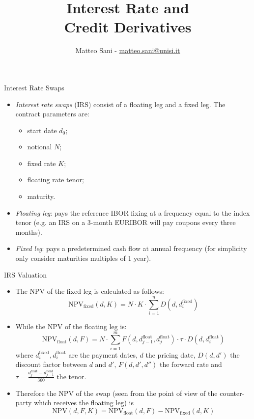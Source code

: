 \documentclass{beamer}
\title{Interest Rate and\\\vspace{0.25cm}Credit Derivatives}
\author{Matteo Sani - \href{mailto:matteo.sani@unisi.it}{matteo.sani@unisi.it}}
\begin{document}
\begin{frame}[plain]
	\maketitle
\end{frame}

\begin{frame}{Interest Rate Swaps}
	\begin{itemize}
		\item \emph{Interest rate swaps} (IRS) consist of a floating leg and a fixed leg. The contract parameters are:
		\begin{itemize}
		\item start date $d_0$;
		\item notional $N$;
		\item fixed rate $K$;
		\item floating rate tenor;
		\item maturity.
		\end{itemize}
		\item \emph{Floating leg}: pays the reference IBOR fixing at a frequency equal to the index tenor (e.g. an IRS on a 3-month EURIBOR will pay coupons every three months).
		\item \emph{Fixed leg}: pays a predetermined cash flow at annual frequency (for simplicity only consider maturities multiples of 1 year).
	\end{itemize}
\end{frame}

\begin{frame}{IRS Valuation}
	\begin{itemize}
		\item The NPV of the fixed leg is calculated as follows:
		\begin{equation*}
		\mathrm{NPV}_{\mathrm{fixed}}(d, K) = N\cdot K\cdot\sum_{i=1}^{n}D(d, d_{i}^{\mathrm{fixed}})
		\end{equation*}
		\item While the NPV of the floating leg is:
		\begin{equation*}
			\mathrm{NPV}_{\mathrm{float}}(d, F) = N\cdot\sum_{i=1}^{m}F(d, d_{j-1}^{\mathrm{float}}, d_{j}^{\mathrm{float}}) \cdot \tau
\cdot D(d, d_{i}^{\mathrm{float}})
		\end{equation*}
		where $d_i^{\mathrm{fixed}}, d_i^{\mathrm{float}}$ are the payment dates, $d$ the pricing date, $D(d, d')$ the discount factor between $d$ and $d'$, $F(d, d', d'')$ the forward rate and $\tau = \frac{d_{j}^{\mathrm{float}}-d_{j-1}^{\mathrm{float}}}{360}$ the tenor.		
		\item Therefore the NPV of the swap (seen from the point of view of the counter-party which receives the floating leg) is
		\begin{equation*}
			\mathrm{NPV}(d, F, K) = \mathrm{NPV}_{\mathrm{float}}(d,F) - \mathrm{NPV}_{\mathrm{fixed}}(d,K)
		\end{equation*} 
	\end{itemize}
\end{frame}
	
\end{document}
